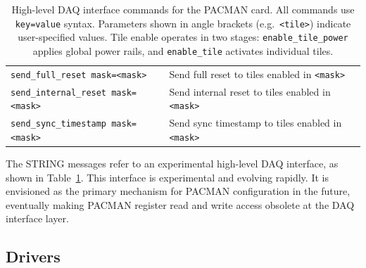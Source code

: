 \documentclass[12pt]{article}
\begin{document}
\begin{table}[h]
\begin{tabular}{|l|l|}
\hline
\texttt{send\_full\_reset mask=<mask>}     & Send full reset to tiles enabled in \texttt{<mask>} \\
\texttt{send\_internal\_reset mask=<mask>} & Send internal reset to tiles enabled in \texttt{<mask>} \\
\texttt{send\_sync\_timestamp mask=<mask>} & Send sync timestamp to tiles enabled in \texttt{<mask>} \\
\hline
\end{tabular}
\caption{High-level DAQ interface commands for the PACMAN card.
All commands use \texttt{key=value} syntax.
Parameters shown in angle brackets (e.g.\ \texttt{<tile>}) indicate user-specified values.
Tile enable operates in two stages: \texttt{enable\_tile\_power} applies global power rails,
and \texttt{enable\_tile} activates individual tiles.}
\label{tbl:high-level}
\end{table}

The STRING messages refer to an experimental high-level DAQ interface, as shown in
Table~\ref{tbl:high-level}.  This interface is experimental and evolving rapidly.  It is envisioned as
the primary mechanism for PACMAN configuration in the future, eventually making PACMAN register read
and write access obsolete at the DAQ interface layer.



\subsection{Drivers}\label{sec:drivers}
\end{document}
